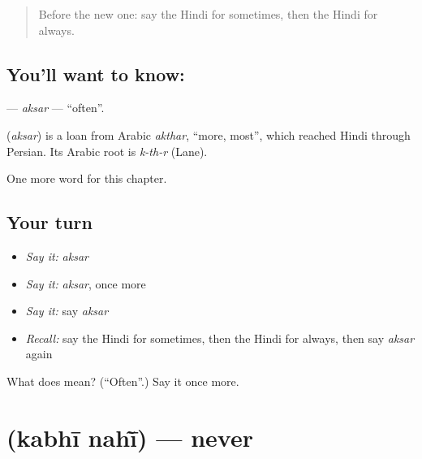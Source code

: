 \label{lesson:HI-C192-aksar}



\begin{quote}
Before the new one: say the Hindi for sometimes, then the Hindi for always.
\end{quote}

\subsection*{You'll want to know: }
\textbf{} — \emph{aksar} — \textquotedblleft{}often\textquotedblright{}.

\begin{cousinweb}
\textbf{} (\emph{aksar}) is a loan from Arabic \emph{akthar}, \textquotedblleft{}more, most\textquotedblright{}, which reached Hindi through Persian. Its Arabic root is \emph{k-th-r} (Lane).
\end{cousinweb}

\begin{grammarlens}[title={What you've built}]
One more word for this chapter.
\end{grammarlens}

\subsection*{Your turn}
\begin{itemize}
\raggedright
  \item \emph{Say it:} \emph{aksar}
  \item \emph{Say it:} \emph{aksar}, once more
  \item \emph{Say it:} say \emph{aksar}
  \item \emph{Recall:} say the Hindi for sometimes, then the Hindi for always, then say \emph{aksar} again
\end{itemize}

\begin{tcolorbox}[breakable,colback=teal!4,colframe=teal!35!black,title={Before you move on}]
What does  mean? (\textquotedblleft{}Often\textquotedblright{}.) Say it once more.
\end{tcolorbox}
\section[\texorpdfstring{\hi{कभी} \hi{नहीं} (kabhī nahī̃)}{कभी नहीं (kabhī nahī̃)}]{  (kabhī nahī̃) — never}

\label{lesson:HI-C192-kabhinahi}



